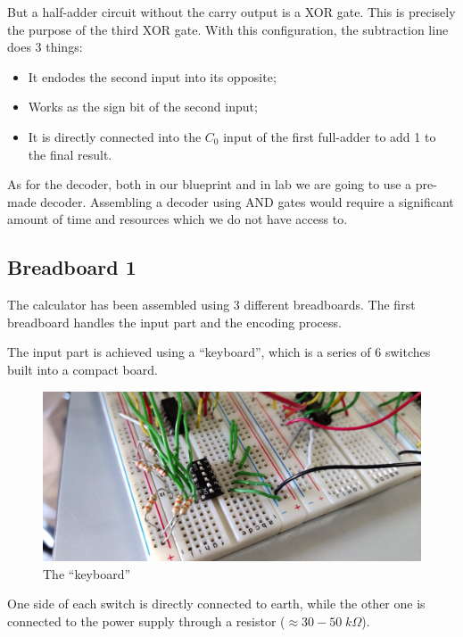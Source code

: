 \documentclass{article}
\begin{document}
But a half-adder circuit without the carry output is a XOR gate. This is precisely the purpose of the third XOR gate. With this configuration, the subtraction line does 3 things:

\begin{itemize}
  \item It endodes the second input into its opposite;
  \item Works as the sign bit of the second input;
  \item It is directly connected into the $C_0$ input of the first full-adder to add 1 to the final result.
\end{itemize}

As for the decoder, both in our blueprint and in lab we are going to use a pre-made decoder. Assembling a decoder using AND gates would require a significant amount of time and resources which we do not have access to.

\subsection{Breadboard 1}

The calculator has been assembled using 3 different breadboards. The first breadboard handles the input part and the encoding process.

\vspace{5mm}

The input part is achieved using a ``keyboard'', which is a series of 6 switches built into a compact board. 

\begin{figure}[h]
  \centering
  \includegraphics[width=\linewidth]{breadboard1_bis}
  \caption{The ``keyboard''}
  \label{breadboard1_bis}
\end{figure}

One side of each switch is directly connected to earth, while the other one is connected to the power supply through a resistor ($\approx 30-50 \; k \Omega$). 
\end{document}
